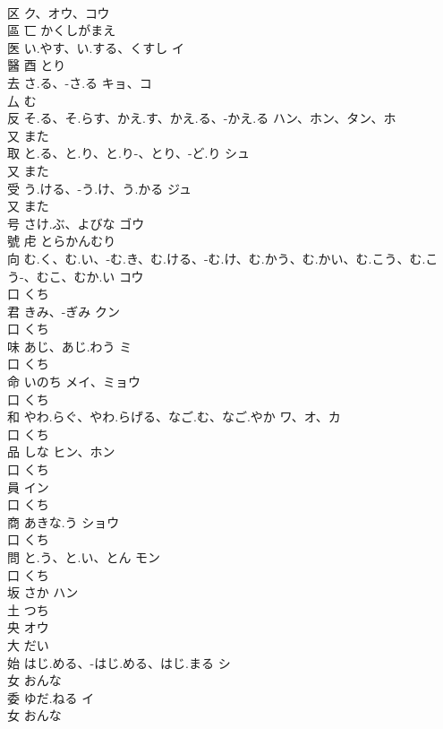 \documentclass[8pt]{extreport}
\begin{document}
\begin{CJK}{UTF8}{min}
\\	区		ク、オウ、コウ	
\\	區	匸		かくしがまえ		
\\	医	い.やす、い.する、くすし	イ	
\\	醫	酉		とり		
\\	去	さ.る、-さ.る	キョ、コ	
\\	厶		む		
\\	反	そ.る、そ.らす、かえ.す、かえ.る、-かえ.る	ハン、ホン、タン、ホ	
\\	又		また		
\\	取	と.る、と.り、と.り-、とり、-ど.り	シュ	
\\	又		また		
\\	受	う.ける、-う.け、う.かる	ジュ	
\\	又		また		
\\	号	さけ.ぶ、よびな	ゴウ	
\\	號	虍		とらかんむり		
\\	向	む.く、む.い、-む.き、む.ける、-む.け、む.かう、む.かい、む.こう、む.こう-、むこ、むか.い	コウ	
\\	口		くち		
\\	君	きみ、-ぎみ	クン	
\\	口		くち		
\\	味	あじ、あじ.わう	ミ	
\\	口		くち		
\\	命	いのち	メイ、ミョウ	
\\	口		くち		
\\	和	やわ.らぐ、やわ.らげる、なご.む、なご.やか	ワ、オ、カ	
\\	口		くち		
\\	品	しな	ヒン、ホン	
\\	口		くち		
\\	員		イン	
\\	口		くち		
\\	商	あきな.う	ショウ	
\\	口		くち		
\\	問	と.う、と.い、とん	モン	
\\	口		くち		
\\	坂	さか	ハン	
\\	土		つち		
\\	央		オウ	
\\	大		だい		
\\	始	はじ.める、-はじ.める、はじ.まる	シ	
\\	女		おんな		
\\	委	ゆだ.ねる	イ	
\\	女		おんな		

\end{CJK}
\end{document}
